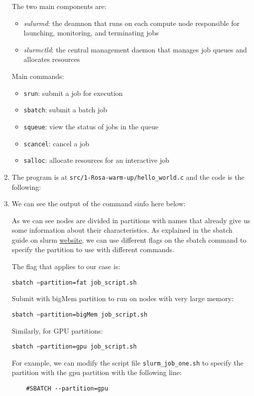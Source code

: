 \documentclass[unicode,11pt,a4paper,oneside,numbers=endperiod,openany]{scrartcl}
\begin{document}
\begin{enumerate}
    The two main components are:
    \begin{itemize}
        \item \textit{sulurmd}: the deamnon that runs on each compute node responsible for launching, monitoring, and terminating jobs
        \item \textit{slurmctld}: the central management daemon that manages job queues and allocates resources
    \end{itemize}

    Main commands:
    \begin{itemize}
        \item \texttt{srun}: submit a job for execution
        \item \texttt{sbatch}: submit a batch job
        \item \texttt{squeue}: view the status of jobs in the queue
        \item \texttt{scancel}: cancel a job
        \item \texttt{salloc}: allocate resources for an interactive job
    \end{itemize}

    \item %
    The program is at \texttt{src/1-Rosa-warm-up/hello\_world.c} and the code is the following:
    

    \item %
    We can see the output of the command sinfo here below: 
    

    As we can see nodes are divided in partitions with names that already give us some information about their characteristics.
    As explained in the sbatch guide on slurm \href{https://slurm.schedmd.com/sbatch.html}{website}, we can use different flags on the sbatch command to specify the partition to use with different commands.


    The flag that applies to our case is:

    \quad\quad\texttt{sbatch --partition=fat job\_script.sh}
    
    Submit with bigMem partition to run on nodes with very large memory:

    \quad\quad\texttt{sbatch --partition=bigMem job\_script.sh}
    
    Similarly, for GPU partitions:
    
    \quad\quad\texttt{sbatch --partition=gpu job\_script.sh}

    For example, we can modify the script file \texttt{slurm\_job\_one.sh} to specify the partition with the gpu partition with the following line:
    \begin{verbatim}
    #SBATCH --partition=gpu
    \end{verbatim}

    


\end{enumerate}
\end{document}
